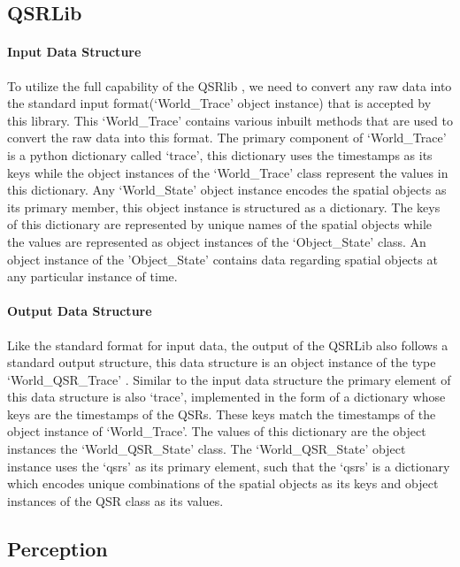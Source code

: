 \subsection{QSRLib}

\paragraph{Input Data Structure}To utilize the full capability of the QSRlib \cite{qsrlib}, we need to convert any raw data into the standard input format(`World\_Trace' object instance) that is accepted by this library. This `World\_Trace' \cite{qsrlib} contains various inbuilt methods that are used to convert the raw data into this format. The primary component of `World\_Trace' is a python dictionary called `trace', this dictionary uses the timestamps as its keys while the object instances of the `World\_Trace' class represent the values in this dictionary. Any `World\_State' object instance encodes the spatial objects as its primary member, this object instance is structured as a dictionary. The keys of this dictionary are represented by unique names of the spatial objects while the values are represented as object instances of the `Object\_State' \cite{qsrlib} class. An object instance of the 'Object\_State' contains data regarding spatial objects at any particular instance of time.

\paragraph{Output Data Structure}Like the standard format for input data, the output of the QSRLib also follows a standard output structure, this data structure is an object instance of the type `World\_QSR\_Trace' \cite{qsrlib}. Similar to the input data structure the primary element of this data structure is also `trace', implemented in the form of a dictionary whose keys are the timestamps of the QSRs. These keys match the timestamps of the object instance of `World\_Trace'. The values of this dictionary are the object instances the `World\_QSR\_State' class. The `World\_QSR\_State' object instance uses the `qsrs' as its primary element, such that the `qsrs' is a dictionary which encodes unique combinations of the spatial objects as its keys and object instances of the QSR class as its values.
\subsection{Perception}
